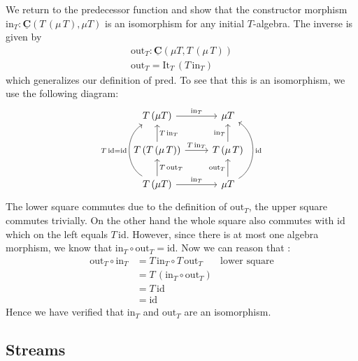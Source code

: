 \documentclass{article}
\newcommand{\cat}[1]{\underline{\mathbf{#1}}}
\newcommand{\homC}[3]{\cat{#1}(#2,#3)}
\newcommand{\id}{\mathrm{id}}
\newcommand{\It}{\mathrm{It}}
\newcommand{\pred}{\mathrm{pred}}
\newcommand{\inn}{\mathrm{in}}
\newcommand{\out}{\mathrm{out}}
\begin{document}
We return to the predecessor function and show that the constructor morphism $\inn_T : \homC{C}{T\,(\mu\,T)}{\mu T}$ is an isomorphism for any initial $T$-algebra. The inverse is given by 
\begin{align*}
\out_T : \homC{C}{\mu T}{T\,(\mu\,T)} \\
\out_T = \It_T\,(T\,\inn_T)
\end{align*}
which generalizes our definition of $\pred$. To see that this is an isomorphism, we use the following diagram:
\[\begin{tikzcd}
T\,(\mu T) \arrow[r,"\inn_T"] & \mu T\\
T\,(T\,(\mu\,T)) \arrow[r,"T\,\inn_T"]  \arrow[u,"T\,\inn_T" right]& T\,(\mu\,T) \arrow[u,"\inn_T" left]\\
T\,(\mu T) \arrow[u, "T\, \out_T" right]  \arrow[r,"\inn_T"] \arrow[uu,"T\,\id = \id",bend left = 60] & \mu T \arrow[u,"\out_T" left] \arrow[uu,"\id" right, bend right = 60]
\end{tikzcd}\]  
The lower square commutes due to the definition of $\out_T$, the upper square commutes trivially. On the other hand the whole square also commutes with $\id$ which on the left equals $T\,\id$. However, since there is at most one algebra morphism, we know that $\inn_T \circ \out_T = \id$. Now we can reason that :
\begin{align*}
  \out_T \circ \inn_T & = T\, \inn_T \circ T\, \out_T & \mbox{lower square} \\
  & = T\,(\inn_T \circ \out_T) \\
  & = T \, \id \\
  & = \id
\end{align*}
Hence we have verified that $\inn_T$ and $\out_T$ are an isomorphism.

\subsection{Streams}
\label{sec:terminal-coalgebras}
\end{document}
